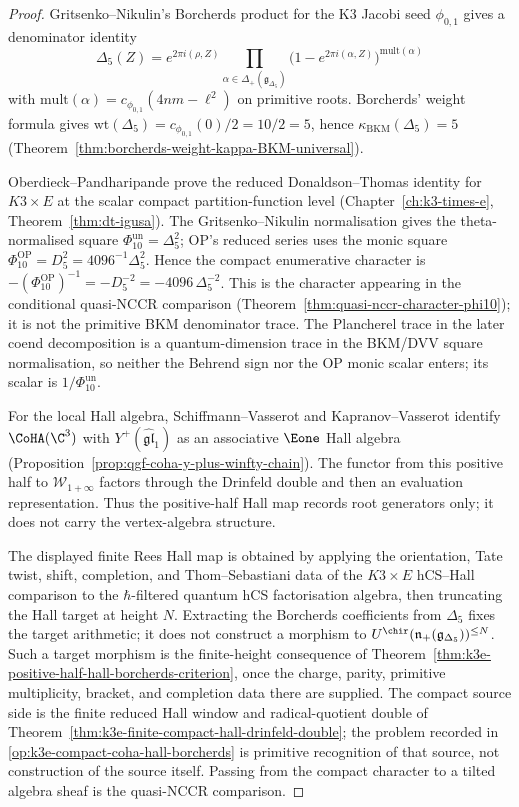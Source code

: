 \begin{proof}
Gritsenko--Nikulin's Borcherds product for the K3 Jacobi seed
$\phi_{0,1}$ gives a denominator identity
\[
 \Delta_5(Z)
 =
 e^{2\pi i(\rho,Z)}
 \prod_{\alpha\in\Delta_+(\mathfrak g_{\Delta_5})}
 \bigl(1-e^{2\pi i(\alpha,Z)}\bigr)^{\mathrm{mult}(\alpha)}
\]
with $\mathrm{mult}(\alpha)=c_{\phi_{0,1}}(4nm-\ell^2)$ on primitive
roots. Borcherds' weight formula gives
$\mathrm{wt}(\Delta_5)=c_{\phi_{0,1}}(0)/2=10/2=5$, hence
$\kappa_{\mathrm{BKM}}(\Delta_5)=5$
(Theorem~\ref{thm:borcherds-weight-kappa-BKM-universal}).

Oberdieck--Pandharipande prove the reduced Donaldson--Thomas identity
for $K3\times E$ at the scalar compact partition-function level
(Chapter~\ref{ch:k3-times-e}, Theorem~\ref{thm:dt-igusa}). The
Gritsenko--Nikulin normalisation gives the theta-normalised square
\(\Phi_{10}^{\mathrm{un}}=\Delta_5^2\); OP's reduced series uses the
monic square \(\Phi_{10}^{\mathrm{OP}}=D_5^2=4096^{-1}\Delta_5^2\).
Hence the compact enumerative character is
\(-(\Phi_{10}^{\mathrm{OP}})^{-1}=-D_5^{-2}
=-4096\,\Delta_5^{-2}\). This is the character appearing in the
conditional quasi-NCCR comparison
(Theorem~\ref{thm:quasi-nccr-character-phi10}); it is not the primitive
BKM denominator trace. The Plancherel trace in the later coend
decomposition is a quantum-dimension trace in the BKM/DVV square
normalisation, so neither the Behrend sign nor the OP monic scalar
enters; its scalar is \(1/\Phi_{10}^{\mathrm{un}}\).

For the local Hall algebra, Schiffmann--Vasserot and
Kapranov--Vasserot identify $\CoHA(\C^3)$ with
$Y^+(\widehat{\mathfrak{gl}}_1)$ as an associative $\Eone$ Hall algebra
(Proposition~\ref{prop:qgf-coha-y-plus-winfty-chain}). The functor from
this positive half to $\mathcal{W}_{1+\infty}$ factors through the
Drinfeld double and then an evaluation representation. Thus the
positive-half Hall map records root generators only; it does not carry
the vertex-algebra structure.

The displayed finite Rees Hall map is obtained by applying the
orientation, Tate twist, shift, completion, and Thom--Sebastiani data of
the $K3\times E$ hCS--Hall comparison to the $\hbar$-filtered quantum
hCS factorisation algebra, then truncating the Hall target at height
$N$. Extracting the Borcherds coefficients from $\Delta_5$ fixes the
target arithmetic; it does not construct a morphism to
$U^{\chir}(\mathfrak n_+(\mathfrak g_{\Delta_5}))^{\le N}$. Such a
target morphism is the finite-height consequence of
Theorem~\ref{thm:k3e-positive-half-hall-borcherds-criterion}, once the
charge, parity, primitive multiplicity, bracket, and completion data
there are supplied. The compact source side is the finite reduced Hall
window and radical-quotient double of
Theorem~\ref{thm:k3e-finite-compact-hall-drinfeld-double}; the problem
recorded in \ref{op:k3e-compact-coha-hall-borcherds} is primitive
recognition of that source, not construction of the source itself.
Passing from the compact character to a tilted algebra sheaf is the
quasi-NCCR comparison.


\end{proof}
